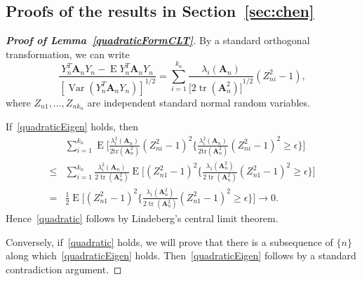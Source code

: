 \documentclass[review]{elsarticle}
\DeclareMathOperator{\mytr}{tr}
\DeclareMathOperator{\myE}{E}
\DeclareMathOperator{\myVar}{Var}
\newcommand{\BA}{\mathbf{A}}    \newcommand{\BB}{\mathbf{B}}    \newcommand{\BC}{\mathbf{C}}    \newcommand{\BD}{\mathbf{D}}    \newcommand{\BE}{\mathbf{E}}    \newcommand{\BF}{\mathbf{F}}    \newcommand{\BG}{\mathbf{G}}    \newcommand{\BH}{\mathbf{H}}    \newcommand{\BI}{\mathbf{I}}    \newcommand{\BJ}{\mathbf{J}}    \newcommand{\BK}{\mathbf{K}}    \newcommand{\BL}{\mathbf{L}}
\theoremstyle{plain}
\theoremstyle{definition}
\theoremstyle{remark}
\begin{document}
\begin{appendices}
    \section{Proofs of the results in Section~\ref{sec:chen}}\label{appendixA}
\begin{proof}[\textbf{Proof of Lemma~\ref{quadraticFormCLT}}]
    By a standard orthogonal transformation, we can write
    \begin{equation}
        \frac{Y_n^T \BA_n Y_n-\myE Y_n^T \BA_n Y_n}{{[\myVar(Y_n^T \BA_n Y_n)]}^{1/2}}=\sum_{i=1}^{k_n}\frac{\lambda_i(\BA_n)}{{\big[2\mytr(\BA_n^2)\big]}^{1/2}}(Z_{ni}^2-1),
    \end{equation}
    where $Z_{n1},\ldots,Z_{n k_n}$ are independent standard normal random variables.

    If~\ref{quadraticEigen} holds, then
    \begin{equation*}
        \begin{aligned}
            &\sum_{i=1}^{k_n}\myE\Big[\frac{\lambda_i^2(\BA_n)}{2\mathrm{tr}(\BA_n^2)}{(Z_{ni}^2-1)}^2\Big\{\frac{\lambda_i^2(\BA_n)}{2\mathrm{tr}(\BA_n^2)}{(Z_{ni}^2-1)}^2\geq \epsilon\Big\}\Big]\\
            \leq&\sum_{i=1}^{k_n}
            \frac{\lambda_i^2(\BA_n)}{2\mytr(\BA_n^2)}
            \myE\Big[{(Z_{n1}^2-1)}^2\Big\{\frac{\lambda_{1}(\BA_n^2)}{2\mytr(\BA_n^2)}{(Z_{n1}^2-1)}^2\geq \epsilon\Big\}\Big]\\
            =&
            \frac{1}{2}\myE\Big[{(Z_{n1}^2-1)}^2\Big\{\frac{\lambda_{1}(\BA_n^2)}{2\mytr(\BA_n^2)}{(Z_{n1}^2-1)}^2\geq \epsilon\Big\}\Big]\to 0.
        \end{aligned}
    \end{equation*}
    Hence~\ref{quadratic} follows by Lindeberg's central limit theorem.

    Conversely, if~\ref{quadratic} holds, we will prove that there is a subsequence of $\{n\}$ along which~\ref{quadraticEigen} holds. Then~\ref{quadraticEigen} follows by a standard contradiction argument. 


\end{proof}
\end{appendices}
\end{document}
